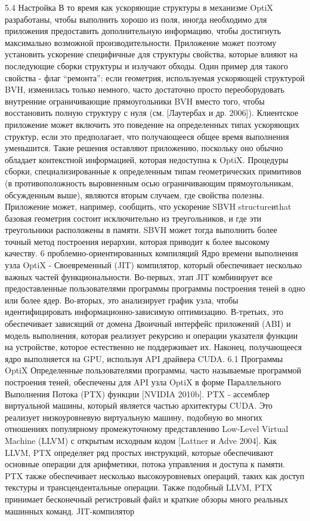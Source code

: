 5.4 Настройка
В то время как ускоряющие структуры в механизме OptiX разработаны, чтобы выполнить хорошо из поля, иногда необходимо для приложения предоставить дополнительную информацию, чтобы достигнуть максимально возможной производительности. Приложение может поэтому установить ускорение специфичные для структуры свойства, которые влияют на последующие сборки структуры и излучают обходы. Один пример для такого свойства - флаг “ремонта”: если геометрия, используемая ускоряющей структурой BVH, изменилась только немного, часто достаточно просто переоборудовать внутренние ограничивающие прямоугольники BVH вместо того, чтобы восстановить полную структуру с нуля (см. [Лаутербах и др. 2006]). Клиентское приложение может включить это поведение на определенных типах ускоряющих структур, если это предполагает, что получающееся общее время выполнения уменьшится. Такие решения оставляют приложению, поскольку оно обычно обладает контекстной информацией, которая недоступна к OptiX. Процедуры сборки, специализированные к определенным типам геометрических примитивов (в противоположность выровненным осью ограничивающим прямоугольникам, обсужденным выше), являются вторым случаем, где свойства полезны. Приложение может, например, сообщить, что ускорение SBVH structureиthat базовая геометрия состоит исключительно из треугольников, и где эти треугольники расположены в памяти. SBVH может тогда выполнить более точный метод построения иерархии, которая приводит к более высокому качеству.
6 проблемно-ориентированных компиляций
Ядро времени выполнения узла OptiX - Своевременный (JIT) компилятор, который обеспечивает несколько важных частей функциональности. Во-первых, этап JIT комбинирует все предоставленные пользователями программы программы построения теней в одно или более ядер. Во-вторых, это анализирует график узла, чтобы идентифицировать информационно-зависимую оптимизацию. В-третьих, это обеспечивает зависящий от домена Двоичный интерфейс приложений (ABI) и модель выполнения, которая реализует рекурсию и операции указателя функции на устройстве, которое естественно не поддерживает их. Наконец, получающееся ядро выполняется на GPU, используя API драйвера CUDA.
6.1 Программы OptiX
Определенные пользователями программы, часто называемые программой построения теней, обеспечены для API узла OptiX в форме Параллельного Выполнения Потока (PTX) функции [NVIDIA 2010b]. PTX - ассемблер виртуальной машины, который является частью архитектуры CUDA. Это реализует низкоуровневую виртуальную машину, подобную во многих отношениях популярному промежуточному представлению Low-Level Virtual Machine (LLVM) с открытым исходным кодом [Lattner и Adve 2004]. Как LLVM, PTX определяет ряд простых инструкций, которые обеспечивают основные операции для арифметики, потока управления и доступа к памяти. PTX также обеспечивает несколько высокоуровневых операций, таких как доступ текстуры и трансцендентальные операции. Также подобный LLVM, PTX принимает бесконечный регистровый файл и краткие обзоры много реальных машинных команд. JIT-компилятор
